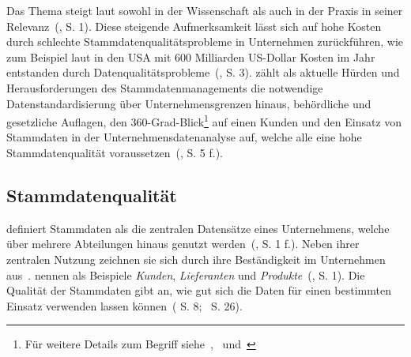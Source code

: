 \documentclass[
  language=german, %
  type=bachelor,%
  ngerman
]{isthesis}
\begin{document}
\begin{content}
	Das Thema steigt laut \textsc{\citeauthor{otto2012design}} sowohl in der
	Wissenschaft als auch in der Praxis in seiner
	Relevanz~(\citeyear{otto2012design}, S. 1). Diese steigende Aufmerksamkeit
	lässt sich auf hohe Kosten durch schlechte Stammdatenqualitätsprobleme in
	Unternehmen zurückführen, wie zum Beispiel laut
	\textsc{\citeauthor{eckerson2002data}} in den USA mit 600 Milliarden
	US-Dollar Kosten im Jahr entstanden durch
	Datenqualitätsprobleme~(\citeyear{eckerson2002data}, S. 3).
	\textsc{\citeauthor{otto2011stammdatenmanagement}} zählt als aktuelle Hürden
	und Herausforderungen des Stammdatenmanagements die notwendige
	Datenstandardisierung über Unternehmensgrenzen hinaus, behördliche und
	gesetzliche Auflagen, den 360-Grad-Blick\footnote{Für weitere Details zum
	Begriff siehe~\cite{kotorov2003customer},~\cite{otto2016datenqualitat}
	und~\cite{otto2016master}} auf einen Kunden und den Einsatz von Stammdaten in
	der Unternehmensdatenanalyse auf, welche alle eine hohe Stammdatenqualität
	voraussetzen~(\citeyear{otto2011stammdatenmanagement}, S. 5 f.).
	

	\subsection{Stammdatenqualität}\label{subsec:stammdatenqualität}
	
	\textsc{\citeauthor{otto2012design}} definiert Stammdaten als die zentralen
	Datensätze eines Unternehmens, welche über mehrere Abteilungen hinaus genutzt
	werden~(\citeyear{otto2012design}, S.  1 f.).  Neben ihrer zentralen Nutzung
	zeichnen sie sich durch ihre Beständigkeit im Unternehmen aus~\cite[][S.
	1]{knolmayer2006quality}.  \textsc{\citeauthor{knolmayer2006quality}} nennen
	als Beispiele \textit{Kunden}, \textit{Lieferanten} und
	\textit{Produkte}~(\citeyear{knolmayer2006quality}, S. 1). Die Qualität der
	Stammdaten gibt an, wie gut sich die Daten für einen bestimmten Einsatz
	verwenden lassen können~(\citeauthor{otto2011stammdatenmanagement}
	\citeyear{otto2011stammdatenmanagement} S.
	8;~\citeauthor{hinrichs2002datenqualitatsmanagement}
	\citeyear{hinrichs2002datenqualitatsmanagement} S. 26).


\end{content}
\end{document}
